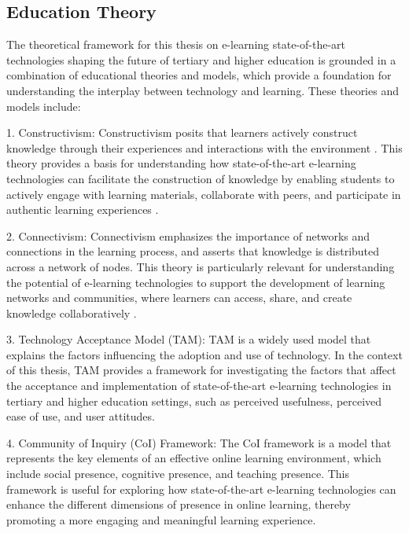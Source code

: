 \subsection{Education Theory}

The theoretical framework for this thesis on e-learning state-of-the-art technologies shaping the future of tertiary and higher education is grounded in a combination of educational theories and models, which provide a foundation for understanding the interplay between technology and learning. These theories and models include:

1. Constructivism: Constructivism posits that learners actively construct knowledge through their experiences and interactions with the environment . This theory provides a basis for understanding how state-of-the-art e-learning technologies can facilitate the construction of knowledge by enabling students to actively engage with learning materials, collaborate with peers, and participate in authentic learning experiences .

2. Connectivism: Connectivism emphasizes the importance of networks and connections in the learning process, and asserts that knowledge is distributed across a network of nodes. This theory is particularly relevant for understanding the potential of e-learning technologies to support the development of learning networks and communities, where learners can access, share, and create knowledge collaboratively .

3. Technology Acceptance Model (TAM): TAM is a widely used model that explains the factors influencing the adoption and use of technology. In the context of this thesis, TAM provides a framework for investigating the factors that affect the acceptance and implementation of state-of-the-art e-learning technologies in tertiary and higher education settings, such as perceived usefulness, perceived ease of use, and user attitudes.

4. Community of Inquiry (CoI) Framework: The CoI framework is a model that represents the key elements of an effective online learning environment, which include social presence, cognitive presence, and teaching presence. This framework is useful for exploring how state-of-the-art e-learning technologies can enhance the different dimensions of presence in online learning, thereby promoting a more engaging and meaningful learning experience.





